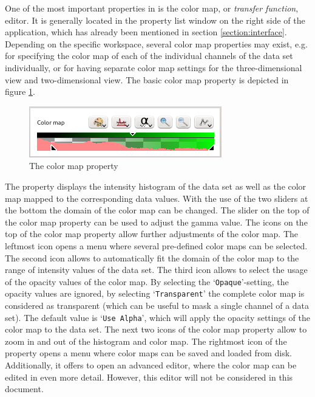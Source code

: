 One of the most important properties in \Voreen is the color map, or \emph{transfer function}, editor. It is generally located in the property list window 
on the right side of the \Voreen application, which has already been mentioned in section \ref{section:interface}. Depending on the specific workspace,
several color map properties may exist, e.g. for specifying the color map of each of the individual channels of the data set individually, or for having separate
color map settings for the three-dimensional view and two-dimensional view. The basic color map property is depicted in figure \ref{fig:color_map_editor}.

\begin{figure}[htb]
 \centering
 \includegraphics[scale=1.0,keepaspectratio=true]{./images/color_map_editor.png}
 \caption{The color map property}
 \label{fig:color_map_editor}
\end{figure}

The property displays the intensity histogram of the data set as well as the color map mapped to the corresponding data values. With the use of the two sliders
at the bottom the domain of the color map can be changed. The slider on the top of the color map property can be used to adjust the gamma value. The icons on
the top of the color map property allow further adjustments of the color map. The leftmost icon opens a menu where several pre-defined color maps can be 
selected. The second icon allows to automatically fit the domain of the color map to the range of intensity values of the data set. The third icon allows to select
the usage of the opacity values of the color map. By selecting the `\verb|Opaque|'-setting, the opacity values are ignored, by selecting `\verb|Transparent|' the
complete color map is considered as transparent (which can be useful to mask a single channel of a data set). The default value is  `\verb|Use Alpha|', which will
apply the opacity settings of the color map to the data set. The next two icons of the color map property allow to zoom in and out of the histogram and color map.
The rightmost icon of the property opens a menu where color maps can be saved and loaded from disk. Additionally, it offers to open an advanced editor, where 
the color map can be edited in even more detail. However, this editor will not be considered in this document. 

